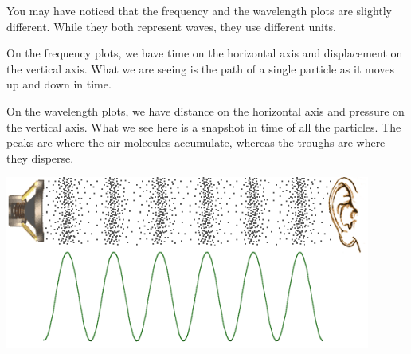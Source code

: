 \documentclass[12pt,noauthor,nooutcomes,hints,handout]{ximera}
\begin{document}
\begin{question}
You may have noticed that the frequency and the wavelength plots are slightly different. While they both represent waves, they use different units. 

On the frequency plots, we have time on the horizontal axis and displacement on the vertical axis. What we are seeing is the path of a single particle as it moves up and down in time. 

On the wavelength plots, we have distance on the horizontal axis and pressure on the vertical axis. What we see here is a snapshot in time of all the particles. The peaks are where the air molecules accumulate, whereas the troughs are where they disperse.

\begin{center}
    \includegraphics[width=0.9\textwidth]{waves/loudspeaker-waveform.png}
\end{center}
\end{question}
\end{document}
